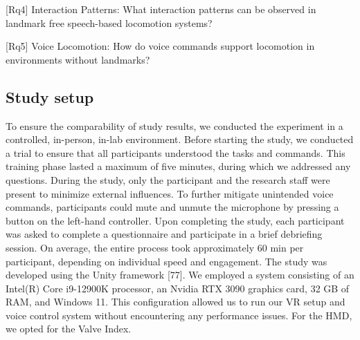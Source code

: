 \documentclass[preprint,12pt]{elsarticle}
\newcommand{\reftext}[1]{{\color{gray}#1}}   %
\begin{document}
\reftext{[Rq4] Interaction Patterns: What interaction patterns can be observed in landmark free speech-based locomotion systems?}

\reftext{[Rq5] Voice Locomotion: How do voice commands support locomotion in environments without landmarks?}

\subsection{Study setup}
\reftext{To ensure the comparability of study results, we conducted the experiment in a controlled, in-person, in-lab environment. Before starting the study, we conducted a trial to ensure that all participants understood the tasks and commands. This training phase lasted a maximum of five minutes, during which we addressed any questions. During the study, only the participant and the research staff were present to minimize external influences. To further mitigate unintended voice commands, participants could mute and unmute the microphone by pressing a button on the left-hand controller. Upon completing the study, each participant was asked to complete a questionnaire and participate in a brief debriefing session. On average, the entire process took approximately 60 min per participant, depending on individual speed and engagement. The study was developed using the Unity framework [77]. We employed a system consisting of an Intel(R) Core i9-12900K processor, an Nvidia RTX 3090 graphics card, 32 GB of RAM, and Windows 11. This configuration allowed us to run our VR setup and voice control system without encountering any performance issues. For the HMD, we opted for the Valve Index.}
\end{document}
